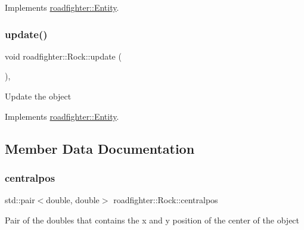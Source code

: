 Implements \hyperlink{classroadfighter_1_1Entity_a611ba56595dd2137d308876ba820cc09}{roadfighter\+::\+Entity}.

\mbox{\label{classroadfighter_1_1Rock_a28d9c3334f54db88785696076a8b6c9c}} 
\subsubsection{\texorpdfstring{update()}{update()}\hspace{0.1cm}{\footnotesize\ttfamily [2/2]}}
{\footnotesize\ttfamily void roadfighter\+::\+Rock\+::update (\begin{DoxyParamCaption}{ }\end{DoxyParamCaption})\hspace{0.3cm}{\ttfamily [override]}, {\ttfamily [virtual]}}

Update the object 

Implements \hyperlink{classroadfighter_1_1Entity_a19cd353f12a3e8432acd6d5609137561}{roadfighter\+::\+Entity}.



\subsection{Member Data Documentation}
\mbox{\label{classroadfighter_1_1Rock_a31327b11d04ef2d368acf12dcffbf21d}} 
\subsubsection{\texorpdfstring{centralpos}{centralpos}}
{\footnotesize\ttfamily std\+::pair$<$double, double$>$ roadfighter\+::\+Rock\+::centralpos\hspace{0.3cm}{\ttfamily [protected]}}

Pair of the doubles that contains the x and y position of the center of the object \mbox{\label{classroadfighter_1_1Rock_a5551bc7292d6e01a3893128eba4ca4f1}} 
